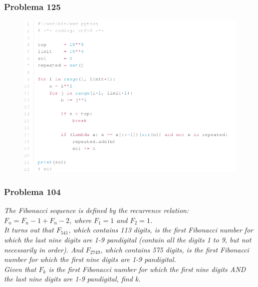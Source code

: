 \documentclass{beamer}
\begin{document}
\begin{frame}
    \frametitle{Problema 125}

    \begin{figure}[htpb]
        \centering
        \includegraphics[width=0.75\linewidth]{images/prob125.png}
    \end{figure}
\end{frame}

\begin{frame}
    \frametitle{Problema 104}

    \begin{center}
        \textit{
            The Fibonacci sequence is defined by the recurrence relation: \\
            $F_n = F_n-1 + F_n-2$, where $F_1 = 1$ and $F_2 = 1$. \\
            It turns out that $F_{541}$, which contains 113 digits, is the first Fibonacci number for which the last nine digits are 1-9 pandigital (contain all the digits 1 to 9, but not necessarily in order).
            And $F_{2749}$, which contains 575 digits, is the first Fibonacci number for which the first nine digits are 1-9 pandigital. \\
            Given that $F_k$ is the first Fibonacci number for which the first nine digits AND the last nine digits are 1-9 pandigital, find k. \\
        }
    \end{center}
\end{frame}
\end{document}
